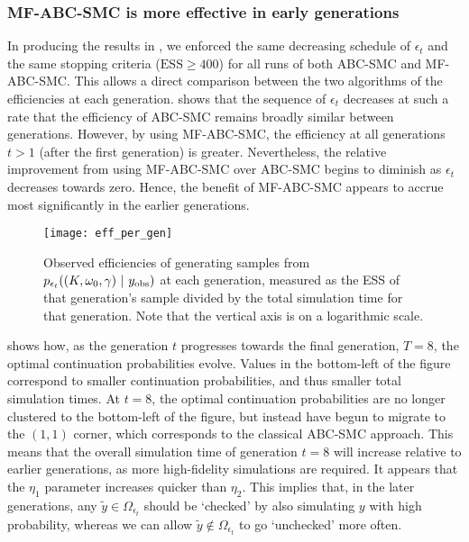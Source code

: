 \documentclass[review,demo]{siamonline190516}
\begin{document}
\subsubsection{MF-ABC-SMC is more effective in early generations}
\label{s:Results:Generations} 

In producing the results in , we enforced the same decreasing schedule of $\epsilon_t$ and the same stopping criteria ($\mathrm{ESS} \geq 400$) for all runs of both ABC-SMC and MF-ABC-SMC.
This allows a direct comparison between the two algorithms of the efficiencies at each generation.
 shows that the sequence of $\epsilon_t$ decreases at such a rate that the efficiency of ABC-SMC remains broadly similar between generations.
However, by using MF-ABC-SMC, the efficiency at all generations $t>1$ (after the first generation) is greater.
Nevertheless, the relative improvement from using MF-ABC-SMC over ABC-SMC begins to diminish as $\epsilon_t$ decreases towards zero.
Hence, the benefit of MF-ABC-SMC appears to accrue most significantly in the earlier generations.

\begin{figure}
\centering
\texttt{[image: eff\_per\_gen]}
\caption{
Observed efficiencies of generating samples from $p_{\epsilon_t}((K, \omega_0, \gamma)~|~y_{\mathrm{obs}})$ at each generation, measured as the ESS of that generation's sample divided by the total simulation time for that generation.
Note that the vertical axis is on a logarithmic scale.
}
\label{fig:efficiencies_generation}
\end{figure}

 shows how, as the generation $t$ progresses towards the final generation, $T=8$, the optimal continuation probabilities evolve.
Values in the bottom-left of the figure correspond to smaller continuation probabilities, and thus smaller total simulation times.
At $t=8$, the optimal continuation probabilities are no longer clustered to the bottom-left of the figure, but instead have begun to migrate to the $(1,1)$ corner, which corresponds to the classical ABC-SMC approach.
This means that the overall simulation time of generation $t=8$ will increase relative to earlier generations, as more high-fidelity simulations are required.
It appears that the $\eta_1$ parameter increases quicker than $\eta_2$.
This implies that, in the later generations, any $\tilde y \in \Omega_{\epsilon_t}$ should be `checked' by also simulating $y$ with high probability, whereas we can allow $\tilde y \notin \Omega_{\epsilon_t}$ to go `unchecked' more often.
\end{document}
